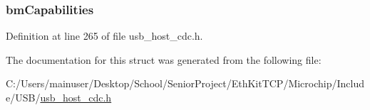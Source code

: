 \subsubsection[{bm\+Capabilities}]{ bm\+Capabilities}\label{struct___u_s_b___c_d_c___a_c_m___f_n___d_s_c_af373a8904dc7eab3ba5d57c69a7bbe01}


Definition at line 265 of file usb\+\_\+host\+\_\+cdc.\+h.



The documentation for this struct was generated from the following file\+:\begin{DoxyCompactItemize}
\item 
C\+:/\+Users/mainuser/\+Desktop/\+School/\+Senior\+Project/\+Eth\+Kit\+T\+C\+P/\+Microchip/\+Include/\+U\+S\+B/\hyperlink{usb__host__cdc_8h}{usb\+\_\+host\+\_\+cdc.\+h}\end{DoxyCompactItemize}
